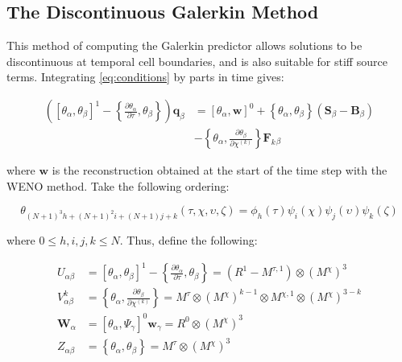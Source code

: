 \documentclass[twoside,english,final,5p,times,twocolumn]{elsarticle}
\begin{document}
\subsection{The Discontinuous Galerkin Method}

This method of computing the Galerkin predictor allows solutions to
be discontinuous at temporal cell boundaries, and is also suitable
for stiff source terms. Integrating \eqref{eq:conditions} by parts
in time gives:

\begin{align}
\left(\left[\theta_{\alpha},\theta_{\beta}\right]^{1}-\left\{ \frac{\partial\theta_{\alpha}}{\partial\tau},\theta_{\beta}\right\} \right)\boldsymbol{q}_{\beta} & =\left[\theta_{\alpha},\boldsymbol{w}\right]^{0}+\left\{ \theta_{\alpha},\theta_{\beta}\right\} \left(\boldsymbol{S}_{\beta}-\boldsymbol{B}_{\beta}\right)\\
 & -\left\{ \theta_{\alpha},\frac{\partial\theta_{\beta}}{\partial\chi^{\left(k\right)}}\right\} \boldsymbol{F}_{k}{}_{\beta}\nonumber 
\end{align}

where $\boldsymbol{w}$ is the reconstruction obtained at the start
of the time step with the WENO method. Take the following ordering:

\begin{equation}
\theta_{\left(N+1\right)^{3}h+\left(N+1\right)^{2}i+\left(N+1\right)j+k}\left(\tau,\chi,\upsilon,\zeta\right)=\phi_{h}\left(\tau\right)\psi_{i}\left(\chi\right)\psi_{j}\left(\upsilon\right)\psi_{k}\left(\zeta\right)
\end{equation}

where $0\leq h,i,j,k\leq N$. Thus, define the following:

\begin{subequations}

\begin{align}
U_{\alpha\beta} & =\left[\theta_{\alpha},\theta_{\beta}\right]^{1}-\left\{ \frac{\partial\theta_{\alpha}}{\partial\tau},\theta_{\beta}\right\} =\left(R^{1}-M^{\tau,1}\right)\otimes\left(M^{\chi}\right)^{3}\\
V_{\alpha\beta}^{k} & =\left\{ \theta_{\alpha},\frac{\partial\theta_{\beta}}{\partial\chi^{\left(k\right)}}\right\} =M^{\tau}\otimes\left(M^{\chi}\right)^{k-1}\otimes M^{\chi,1}\otimes\left(M^{\chi}\right)^{3-k}\\
\boldsymbol{W}_{\alpha} & =\left[\theta_{\alpha},\Psi_{\gamma}\right]^{0}\boldsymbol{w}_{\gamma}=R^{0}\otimes\left(M^{\chi}\right)^{3}\\
Z_{\alpha\beta} & =\left\{ \theta_{\alpha},\theta_{\beta}\right\} =M^{\tau}\otimes\left(M^{\chi}\right)^{3}
\end{align}

\end{subequations}
\end{document}
